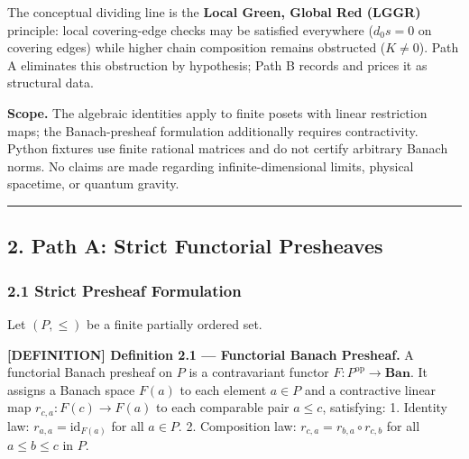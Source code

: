 \documentclass[
  english,
  10pt,
  a4paper,
]{article}
\renewenvironment{quote}
  {\begin{leftbar}\small}
  {\end{leftbar}}
\begin{document}
The conceptual dividing line is the \textbf{Local Green, Global Red
(LGGR)} principle: local covering-edge checks may be satisfied
everywhere (\(d_0s=0\) on covering edges) while higher chain composition
remains obstructed (\(K\ne0\)). Path A eliminates this obstruction by
hypothesis; Path B records and prices it as structural data.

\textbf{Scope.} The algebraic identities apply to finite posets with
linear restriction maps; the Banach-presheaf formulation additionally
requires contractivity. Python fixtures use finite rational matrices and
do not certify arbitrary Banach norms. No claims are made regarding
infinite-dimensional limits, physical spacetime, or quantum gravity.

\begin{center}\rule{0.5\linewidth}{0.5pt}\end{center}

\subsection{2. Path A: Strict Functorial
Presheaves}\label{path-a-strict-functorial-presheaves}

\subsubsection{2.1 Strict Presheaf
Formulation}\label{strict-presheaf-formulation}

Let \((P,\le)\) be a finite partially ordered set.

\begin{quote}
\textbf{{[}DEFINITION{]} Definition 2.1 --- Functorial Banach Presheaf.}
A functorial Banach presheaf on \(P\) is a contravariant functor
\(F:P^{\mathrm{op}}\to\mathbf{Ban}\). It assigns a Banach space \(F(a)\)
to each element \(a\in P\) and a contractive linear map
\(r_{c,a}:F(c)\to F(a)\) to each comparable pair \(a\le c\), satisfying:
1. Identity law: \(r_{a,a}=\mathrm{id}_{F(a)}\) for all \(a\in P\). 2.
Composition law: \(r_{c,a}=r_{b,a}\circ r_{c,b}\) for all
\(a\le b\le c\) in \(P\).
\end{quote}
\end{document}
